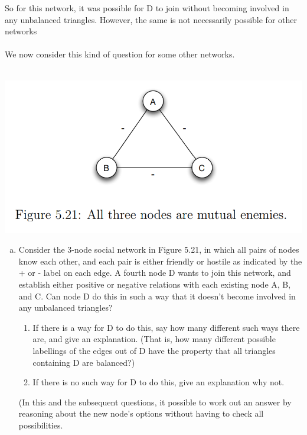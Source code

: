 \documentclass[11pt]{article}
\begin{document}
\begin{enumerate}
So for this network, it was possible for D to join without becoming involved in any unbalanced triangles. However, the same is not necessarily possible for other networks\\\\
We now consider this kind of question for some other networks.\\\\
\begin{center}
	\includegraphics[scale=1]{Figure_5_21}\\
\end{center}
	\begin{enumerate}[(a)]
		\item Consider the 3-node social network in Figure 5.21, in which all pairs of nodes know each other, and each pair is either friendly or hostile as indicated by the + or - label on each edge. A fourth node D wants to join this network, and establish either positive or negative relations with each existing node A, B, and C. Can node D do this in such a way that it doesn’t become involved in any unbalanced triangles?\\
		\begin{enumerate}[*]
			\item  If there is a way for D to do this, say how many different such ways there are, and give an explanation. (That is, how many different possible labellings of the edges out of D have the property that all triangles containing D are balanced?)
			\item If there is no such way for D to do this, give an explanation why not. 
		\end{enumerate}
(In this and the subsequent questions, it possible to work out an answer by reasoning about the new node’s options without having to check all possibilities.\\

\end{enumerate}
\end{enumerate}
\end{document}
